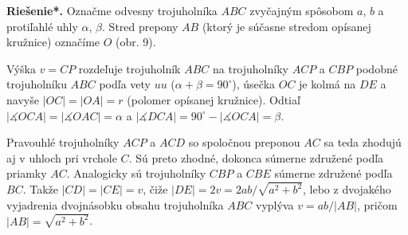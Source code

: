 \documentclass[11pt,a4paper,oneside,final]{book}
\newcommand{\rieh}{\textbf{Riešenie*.} }
\newcommand{\ma}{\measuredangle}
\begin{document}
\rieh Označme odvesny trojuholníka $ABC$ zvyčajným spôsobom $a$, $b$ a protiľahlé uhly $\alpha$, $\beta$. Stred prepony $AB$ (ktorý je súčasne stredom opísanej kružnice) označíme $O$ (obr. 9).

Výška $v = CP$ rozdeľuje trojuholník $ABC$ na trojuholníky $ACP$ a $CBP$ podobné trojuholníku $ABC$ podľa vety $uu$ ($\alpha + \beta = 90^\circ$), úsečka $OC$ je kolmá na $DE$ a navyše $|OC| = |OA| = r$ (polomer opísanej kružnice). Odtiaľ $|\ma OCA| = |\ma OAC| = \alpha$ a $|\ma DCA| = 90^\circ - |\ma OCA| = \beta$.

Pravouhlé trojuholníky $ACP$ a $ACD$ so spoločnou preponou $AC$ sa teda zhodujú aj v uhloch pri vrchole $C$. Sú preto zhodné, dokonca súmerne združené podľa priamky $AC$. Analogicky sú trojuholníky $CBP$ a $CBE$ súmerne združené podľa $BC$. Takže $|CD|= |CE| = v$, čiže $|DE| = 2v = 2ab/\sqrt{a^2 + b^2}$, lebo z dvojakého vyjadrenia dvojnásobku obsahu trojuholníka $ABC$ vyplýva $v = ab/|AB|$, pričom $|AB| =\sqrt{a^2 + b^2}$.
\end{document}
